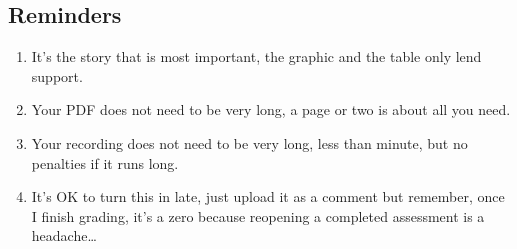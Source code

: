 \documentclass[
  letterpaper,
  DIV=11,
  numbers=noendperiod]{scrartcl}
\providecommand{\tightlist}{%
  \setlength{\itemsep}{0pt}\setlength{\parskip}{0pt}}\usepackage{longtable,booktabs,array}
\begin{document}
\subsection{Reminders}\label{reminders}

\begin{enumerate}
\def\labelenumi{\arabic{enumi}.}
\tightlist
\item
  It's the story that is most important, the graphic and the table only
  lend support.
\item
  Your PDF does not need to be very long, a page or two is about all you
  need.
\item
  Your recording does not need to be very long, less than minute, but no
  penalties if it runs long.
\item
  It's OK to turn this in late, just upload it as a comment but
  remember, once I finish grading, it's a zero because reopening a
  completed assessment is a headache\ldots{}
\end{enumerate}
\end{document}
